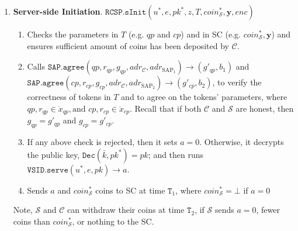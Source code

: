 \begin{enumerate}
\begin{enumerate}

\end{enumerate}

\
\item \textbf{Server-side Initiation}. $\mathtt{RCSP}.\mathtt{sInit}(u^{\scriptscriptstyle *},e, pk^{\scriptscriptstyle *},z, T, coin^{\scriptscriptstyle *}_{\scriptscriptstyle\mathcal S} ,\bm{y},enc)$

\begin{enumerate}

\item Checks the parameters  in $T$ (e.g. $qp$ and $cp$) and  in SC (e.g. $coin^{\scriptscriptstyle *}_{\scriptscriptstyle\mathcal S}, \bm{y}$) and ensures sufficient amount of coins has been deposited by $\mathcal C$.  

\item Calls $\mathtt{SAP.agree}(qp,r_{\scriptscriptstyle qp},g_{\scriptscriptstyle qp},adr_{\scriptscriptstyle\mathcal{C}},adr_{\scriptscriptstyle\text{SAP}_{1}})\rightarrow (g'_{\scriptscriptstyle qp},b_{\scriptscriptstyle 1})$ and $\mathtt{SAP.agree}(cp,r_{\scriptscriptstyle cp},g_{\scriptscriptstyle cp},adr_{\scriptscriptstyle\mathcal{C}},adr_{\scriptscriptstyle\text{SAP}_{2}})\rightarrow (g'_{\scriptscriptstyle cp},b_{\scriptscriptstyle 2})$, to verify the correctness of tokens in $T$ and to agree on the tokens' parameters, where $qp,r_{\scriptscriptstyle qp}\in \ddot{x}_{\scriptscriptstyle qp}, \text{and }  cp,r_{\scriptscriptstyle cp} \in  \ddot{x}_{\scriptscriptstyle cp}$. Recall that if both $\mathcal{C}$ and $\mathcal{S}$ are honest, then $g_{\scriptscriptstyle qp}=g'_{\scriptscriptstyle qp}$ and $g_{\scriptscriptstyle cp}=g'_{\scriptscriptstyle cp}$. 




\item If any above check is rejected, then it sets $a=0$. Otherwise, it decrypts the public key, $\mathtt{Dec}(\bar{k},pk^{\scriptscriptstyle *})=pk$; and then runs $\mathtt{VSID.serve}(u^{\scriptscriptstyle *},e,pk)\rightarrow a$. 

\item Sends $a$ and $coin^{\scriptscriptstyle *}_{\scriptscriptstyle\mathcal S}$ coins to SC at time $\texttt{T}_{\scriptscriptstyle 1}$, where  $coin^{\scriptscriptstyle *}_{\scriptscriptstyle\mathcal S}=\bot$ if $a=0$
\end{enumerate}
Note, $\mathcal S$  and  $\mathcal C$ can withdraw their coins at time $\texttt{T}_{\scriptscriptstyle 2}$, if  $\mathcal S$ sends $a=0$, fewer coins than $coin^{\scriptscriptstyle *}_{\scriptscriptstyle\mathcal S}$, or nothing to the SC. 


\end{enumerate}

